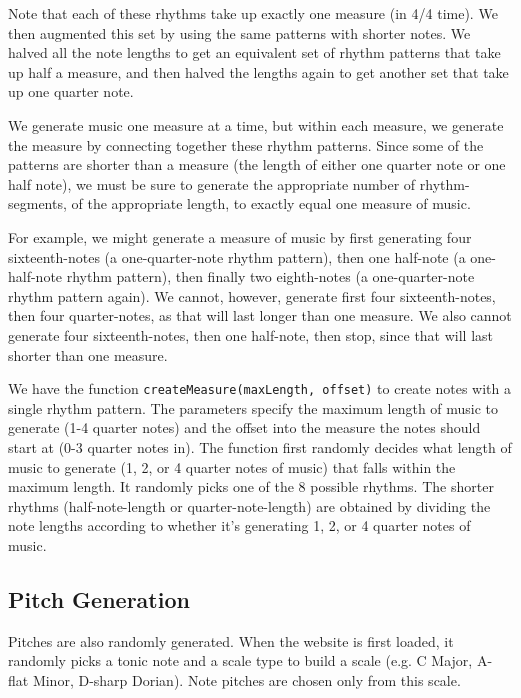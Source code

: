 \documentclass[12pt,a4paper]{article}
\begin{document}
Note that each of these rhythms take up exactly one measure (in 4/4 time).
We then augmented this set by using the same patterns with shorter notes. We halved all the note lengths to get an equivalent set of rhythm patterns that take up half a measure, and then halved the lengths again to get another set that take up one quarter note.

We generate music one measure at a time, but within each measure, we generate the measure by connecting together these rhythm patterns. Since some of the patterns are shorter than a measure (the length of either one quarter note or one half note), we must be sure to generate the appropriate number of rhythm-segments, of the appropriate length, to exactly equal one measure of music.

For example, we might generate a measure of music by first generating four sixteenth-notes (a one-quarter-note rhythm pattern), then one half-note (a one-half-note rhythm pattern), then finally two eighth-notes (a one-quarter-note rhythm pattern again). We cannot, however, generate first four sixteenth-notes, then four quarter-notes, as that will last longer than one measure. We also cannot generate four sixteenth-notes, then one half-note, then stop, since that will last shorter than one measure.

We have the function \texttt{createMeasure(maxLength, offset)} to create notes with a single rhythm pattern. The parameters specify the maximum length of music to generate (1-4 quarter notes) and the offset into the measure the notes should start at (0-3 quarter notes in). The function first randomly decides what length of music to generate (1, 2, or 4 quarter notes of music) that falls within the maximum length. It randomly picks one of the 8 possible rhythms. The shorter rhythms (half-note-length or quarter-note-length) are obtained by dividing the note lengths according to whether it's generating 1, 2, or 4 quarter notes of music.

\subsection{Pitch Generation}

Pitches are also randomly generated. When the website is first loaded, it randomly picks a tonic note and a scale type to build a scale (e.g. C Major, A-flat Minor, D-sharp Dorian). Note pitches are chosen only from this scale. 

\end{document}
